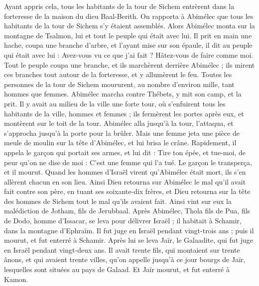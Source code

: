 \begin{multicols}{2}
Ayant appris cela, tous les habitants de la tour de Sichem entrèrent dans la forteresse de la maison du dieu Baal-Berith.
On rapporta à Abimélec que tous les habitants de la tour de Sichem s'y étaient assemblés.
Alors Abimélec monta sur la montagne de Tsalmon, lui et tout le peuple qui était avec lui. Il prit en main une hache, coupa une branche d'arbre, et l'ayant mise sur son épaule, il dit au peuple qui était avec lui : Avez-vous vu ce que j'ai fait ? Hâtez-vous de faire comme moi.
Tout le peuple coupa une branche, et ils marchèrent derrière Abimélec ; ils mirent ces branches tout autour de la forteresse, et y allumèrent le feu. Toutes les personnes de la tour de Sichem moururent, au nombre d'environ mille, tant hommes que femmes.
Abimélec marcha contre Thébets, y mit son camp, et la prit.
Il y avait au milieu de la ville une forte tour, où s'enfuirent tous les habitants de la ville, hommes et femmes ; ils fermèrent les portes après eux, et montèrent sur le toit de la tour.
Abimélec alla jusqu'à la tour, l'attaqua, et s'approcha jusqu'à la porte pour la brûler.
Mais une femme jeta une pièce de meule de moulin sur la tête d'Abimélec, et lui brisa le crâne.
Rapidement, il appela le garçon qui portait ses armes, et lui dit : Tire ton épée, et tue-moi, de peur qu'on ne dise de moi : C'est une femme qui l'a tué. Le garçon le transperça, et il mourut.
Quand les hommes d'Israël virent qu'Abimélec était mort, ils s'en allèrent chacun en son lieu.
Ainsi Dieu retourna sur Abimélec le mal qu'il avait fait contre son père, en tuant ses soixante-dix frères,
et Dieu retourna sur la tête des hommes de Sichem tout le mal qu'ils avaient fait. Ainsi vint sur eux la malédiction de Jotham, fils de Jerubbaal.
\VerseOne{}Après Abimélec, Thola fils de Pua, fils de Dodo, homme d'Issacar, se leva pour délivrer Israël ; il habitait à Schamir, dans la montagne d'Ephraïm.
Il fut juge en Israël pendant vingt-trois ans ; puis il mourut, et fut enterré à Schamir.
Après lui se leva Jaïr, le Galaadite, qui fut juge en Israël pendant vingt-deux ans.
Il avait trente fils, qui montaient sur trente ânons, et qui avaient trente villes, qu'on appelle jusqu'à ce jour bourgs de Jaïr, lesquelles sont situées au pays de Galaad.
Et Jaïr mourut, et fut enterré à Kamon.

\end{multicols}
